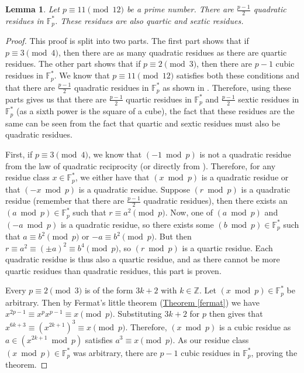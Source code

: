 \documentclass[openany, a4paper, 10pt]{book}
\theoremstyle{plain}
\theoremstyle{plain}
\theoremstyle{plain}
\newtheorem{lemma}[theorem]{Lemma}
\theoremstyle{definition}
\theoremstyle{plain}
\theoremstyle{definition}
\theoremstyle{remark}
\newcommand{\theoref}[1]{\hyperref[#1]{Theorem \ref{#1}}}
\begin{document}
\begin{lemma}\label{quartic_sextic}
    Let $p \equiv 11 \pmod {12}$ be a prime number.
    There are $\frac{p-1}{2}$ quadratic residues in $\mathbb F_p^*$.
    These residues are also quartic and sextic residues.
\end{lemma}
\begin{proof}
    This proof is split into two parts.
    The first part shows that if $p \equiv 3 \pmod 4$, then there are as many quadratic residues as there are quartic residues.
    The other part shows that if $p \equiv 2 \pmod 3$, then there are $p-1$ cubic residues in $\mathbb F_p^*$.
    We know that $p \equiv 11 \pmod {12}$ satisfies both these conditions and that there are $\frac{p-1}{2}$ quadratic residues in $\mathbb F_p^*$ as shown in \cite[Theorem~3.1]{num_residues}.
    Therefore, using these parts gives us that there are $\frac{p-1}{2}$ quartic residues in $\mathbb F_p^*$ and $\frac{p-1}{2}$ sextic residues in $\mathbb F_p^*$ (as a sixth power is the square of a cube), the fact that these residues are the same can be seen from the fact that quartic and sextic residues must also be quadratic residues.

    First, if $p \equiv 3 \pmod 4$, we know that $(-1 \bmod p)$ is not a quadratic residue from the law of quadratic reciprocity (or directly from \cite[Theorem~1.6]{quadrat_recip}).
    Therefore, for any residue class $x \in \mathbb F_p^*$, we either have that $(x \bmod p)$ is a quadratic residue or that $(-x \bmod p)$ is a quadratic residue.
    Suppose $(r \bmod p)$ is a quadratic residue (remember that there are $\frac{p-1}{2}$ quadratic residues), then there exists an $(a \bmod p) \in \mathbb F_p^*$ such that $r \equiv a^2 \pmod p$.
    Now, one of $(a \bmod p)$ and $(-a \bmod p)$ is a quadratic residue, so there exists some $(b \bmod p) \in \mathbb F_p^*$ such that $a \equiv b^2 \pmod p$ or $-a \equiv b^2 \pmod p$.
    But then $r \equiv a^2 \equiv (\pm a)^2 \equiv b^4 \pmod p$, so $(r \bmod p)$ is a quartic residue.
    Each quadratic residue is thus also a quartic residue, and as there cannot be more quartic residues than quadratic residues, this part is proven.

    Every $p \equiv 2 \pmod 3$ is of the form $3k+2$ with $k \in \mathbb Z$.
    Let $(x \bmod p)\in \mathbb F_p^*$ be arbitrary.
    Then by Fermat's little theorem (\theoref{fermat}) we have $x^{2p-1} \equiv x^{p} x^{p-1} \equiv x \pmod p$.
    Substituting $3k+2$ for $p$ then gives that $x^{6k+3} \equiv (x^{2k+1})^3 \equiv x \pmod p$.
    Therefore, $(x \bmod p)$ is a cubic residue as $a \in (x^{2k+1} \bmod p)$ satisfies $a^3 \equiv x \pmod p$.
    As our residue class $(x\bmod p) \in \mathbb F_p^*$ was arbitrary, there are $p-1$ cubic residues in $\mathbb F_p^*$, proving the theorem.
\end{proof}
\end{document}
